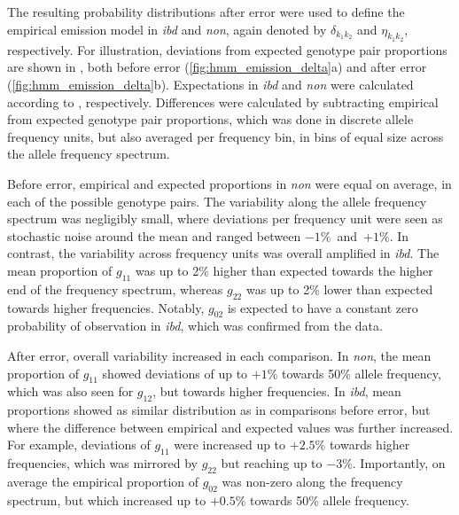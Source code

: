 %

%

The resulting probability distributions after error were used to define the empirical emission model in \emph{ibd} and \emph{non}, again denoted by $\delta_{k_1 k_2}$ and $\eta_{k_1 k_2}$, respectively.
For illustration, deviations from expected genotype pair proportions are shown in , both before error (\ref{fig:hmm_emission_delta}{a}) and after error (\ref{fig:hmm_emission_delta}{b}).
Expectations in \emph{ibd} and \emph{non} were calculated according to , respectively.
Differences were calculated by subtracting empirical from expected genotype pair proportions, which was done in discrete allele frequency units, but also averaged per frequency bin, in  bins of equal size across the allele frequency spectrum.

Before error, empirical and expected proportions in \emph{non} were equal on average, in each of the  possible genotype pairs.
The variability along the allele frequency spectrum was negligibly small, where deviations per frequency unit were seen as stochastic noise around the mean and ranged between $-1\%$~and~$+1\%$.
In contrast, the variability across frequency units was overall amplified in \emph{ibd}.
The mean proportion of $g_{11}$ was up to 2\% higher than expected towards the higher end of the frequency spectrum, whereas $g_{22}$ was up to 2\% lower than expected towards higher frequencies.
Notably, $g_{02}$ is expected to have a constant zero probability of observation in \emph{ibd}, which was confirmed from the data.

After error, overall variability increased in each comparison.
In \emph{non}, the mean proportion of $g_{11}$ showed deviations of up to $+1\%$ towards 50\% allele frequency, which was also seen for $g_{12}$, but towards higher frequencies.
In \emph{ibd}, mean proportions showed as similar distribution as in comparisons before error, but where the difference between empirical and expected values was further increased.
For example, deviations of $g_{11}$ were increased up to $+2.5\%$ towards higher frequencies, which was mirrored by $g_{22}$ but reaching up to $-3\%$.
Importantly, on average the empirical proportion of $g_{02}$ was non-zero along the frequency spectrum, but which increased up to $+0.5\%$ towards 50\% allele frequency.


